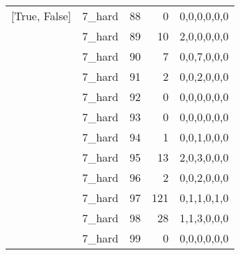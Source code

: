 \begin{tabular}{llrrl}
 [True, False]   & 7\_hard              &            88 &                     0 & 0,0,0,0,0,0   \\
 [True, False]   & 7\_hard              &            89 &                    10 & 2,0,0,0,0,0   \\
 [True, False]   & 7\_hard              &            90 &                     7 & 0,0,7,0,0,0   \\
 [True, False]   & 7\_hard              &            91 &                     2 & 0,0,2,0,0,0   \\
 [True, False]   & 7\_hard              &            92 &                     0 & 0,0,0,0,0,0   \\
 [True, False]   & 7\_hard              &            93 &                     0 & 0,0,0,0,0,0   \\
 [True, False]   & 7\_hard              &            94 &                     1 & 0,0,1,0,0,0   \\
 [True, False]   & 7\_hard              &            95 &                    13 & 2,0,3,0,0,0   \\
 [True, False]   & 7\_hard              &            96 &                     2 & 0,0,2,0,0,0   \\
 [True, False]   & 7\_hard              &            97 &                   121 & 0,1,1,0,1,0   \\
 [True, False]   & 7\_hard              &            98 &                    28 & 1,1,3,0,0,0   \\
 [True, False]   & 7\_hard              &            99 &                     0 & 0,0,0,0,0,0   \\
\hline
\end{tabular}